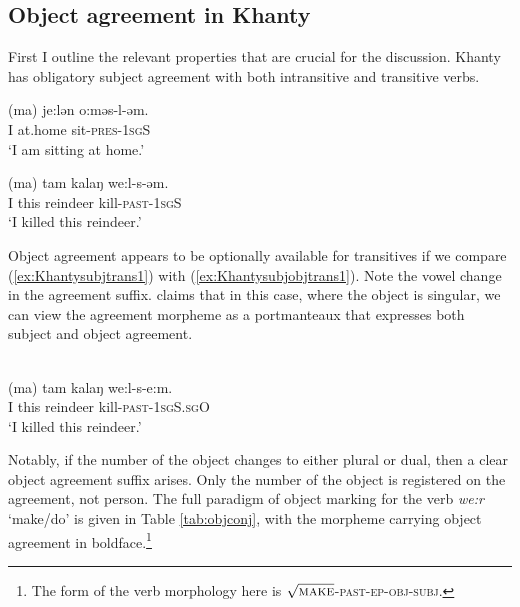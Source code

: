 \documentclass[output=paper
,modfonts
,nonflat]{langsci/langscibook}
\begin{document}
\subsection{Object agreement in Khanty}\label{khantyprop}

First I outline the relevant properties that are crucial for the discussion.
Khanty has obligatory subject agreement with both intransitive and transitive verbs. 

\begin{exe}
\ex \citet[][142]{dn2011}
\begin{xlist}
\ex
{\gll (ma) je:lən o:məs-l-əm.\\
I at.home sit-\textsc{pres}-\textsc{1sgS}\\
\glt `I am sitting at home.'} \label{ex:ostsubjintrans1}

\ex
{\gll (ma) tam kalaŋ we:l-s-əm.\\
I this reindeer kill-\textsc{past-1sgS}\\
\glt `I killed this reindeer.'} \label{ex:Khantysubjtrans1}
\end{xlist}
\end{exe}

\noindent Object agreement appears to be optionally available for transitives if we compare (\ref{ex:Khantysubjtrans1}) with (\ref{ex:Khantysubjobjtrans1}). Note the vowel change in the agreement suffix. \citet{nikolaeva1999} claims that in this case, where the object is singular, we can view the agreement morpheme as a portmanteaux that expresses both subject and object agreement. 

\begin{exe}
  \ex \citet[][142]{dn2011}\\
{\gll (ma) tam kalaŋ we:l-s-e:m.\\
I this reindeer kill-\textsc{past-1sgS.sgO}\\
\glt `I killed this reindeer.'} \label{ex:Khantysubjobjtrans1}
\end{exe}

\noindent Notably, if the number of the object changes to either plural or dual, then a clear object agreement suffix arises.
Only the number of the object is registered on the agreement, not person.
The full paradigm of object marking for the verb \emph{we:r} `make/do' is given in Table \ref{tab:objconj}, with the morpheme carrying object agreement in boldface.\footnote{The form of the verb morphology here is $\sqrt{\textsc{make}}$-\textsc{past}-\textsc{ep}-\textsc{obj}-\textsc{subj}.}
\end{document}
